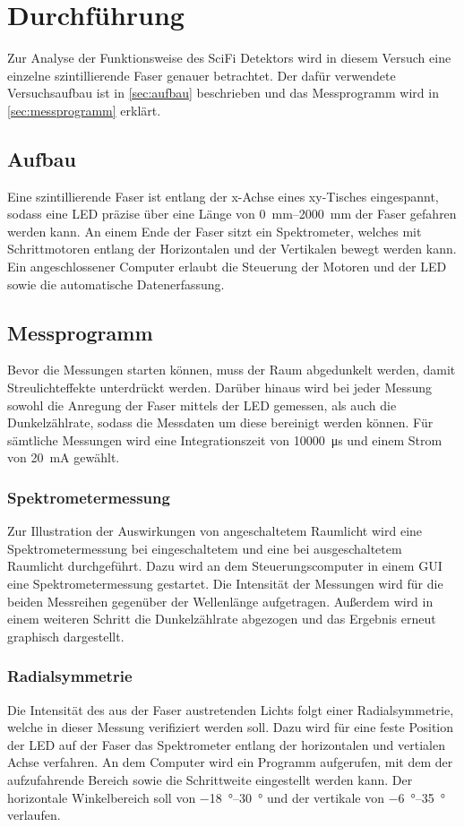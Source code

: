 \section{Durchführung}
\label{sec:Durchführung}
Zur Analyse der Funktionsweise des SciFi Detektors wird in diesem Versuch eine einzelne szintillierende Faser genauer betrachtet. Der dafür verwendete 
Versuchsaufbau ist in \autoref{sec:aufbau} beschrieben und das Messprogramm wird in \autoref{sec:messprogramm} erklärt.

\subsection{Aufbau}
\label{sec:aufbau}
Eine szintillierende Faser ist entlang der x-Achse eines xy-Tisches eingespannt, sodass eine LED präzise über eine Länge von \qtyrange{0}{2000}{\milli\metre}
der Faser gefahren werden kann. An einem Ende der Faser sitzt ein Spektrometer, welches mit Schrittmotoren entlang der Horizontalen und der Vertikalen bewegt
werden kann. Ein angeschlossener Computer erlaubt die Steuerung der Motoren und der LED sowie die automatische Datenerfassung.

\subsection{Messprogramm}
\label{sec:messprogramm}
Bevor die Messungen starten können, muss der Raum abgedunkelt werden, damit Streulichteffekte unterdrückt werden. Darüber hinaus wird bei jeder Messung 
sowohl die Anregung der Faser mittels der LED gemessen, als auch die Dunkelzählrate, sodass die Messdaten um diese bereinigt werden können. Für sämtliche Messungen
wird eine Integrationszeit von \qty{10000}{\micro\second} und einem Strom von \qty{20}{\milli\ampere} gewählt.

\subsubsection{Spektrometermessung}
Zur Illustration der Auswirkungen von angeschaltetem Raumlicht wird eine Spektrometermessung bei eingeschaltetem und eine bei ausgeschaltetem Raumlicht durchgeführt.
Dazu wird an dem Steuerungscomputer in einem GUI eine Spektrometermessung
gestartet. Die Intensität der Messungen wird für die beiden Messreihen gegenüber der Wellenlänge aufgetragen. Außerdem wird in einem weiteren Schritt die 
Dunkelzählrate abgezogen und das Ergebnis erneut graphisch dargestellt.

\subsubsection{Radialsymmetrie}
Die Intensität des aus der Faser austretenden Lichts folgt einer Radialsymmetrie, welche in dieser Messung verifiziert werden soll. Dazu wird für eine feste Position
der LED auf der Faser das Spektrometer entlang der horizontalen und vertialen Achse verfahren. An dem Computer wird ein Programm aufgerufen, mit dem der aufzufahrende 
Bereich sowie die Schrittweite eingestellt werden kann. Der horizontale Winkelbereich soll von \qtyrange{-18}{30}{\degree} und der vertikale von \qtyrange{-6}{35}{\degree}
verlaufen.

